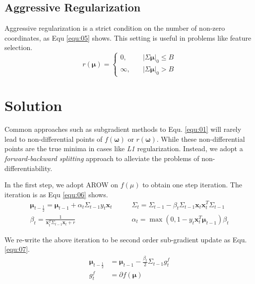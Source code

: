 \documentclass{article}
\begin{document}
\subsection{Aggressive Regularization}
Aggressive regularization is a strict condition on the number of non-zero
coordinates, as Equ \ref{equ:05} shows. This setting is useful in problems like feature selection.
\begin{equation}
    r(\bm{\mu}) = \left\{
        \begin{aligned}
            0, \quad & |\Sigma\bm{\mu}|_0 \leq B \\
            \infty, \quad & |\Sigma\bm{\mu}|_0 > B
        \end{aligned}
        \right.
    \label{equ:05}
\end{equation}

\section{Solution}
Common approaches such as subgradient methods to Equ. \ref{equ:01} will rarely
lead to non-differential points of $f(\bm{\omega})$ or $r(\bm{\omega})$. While
these non-differential points are the true minima in cases like \textit{L1}
regularization. Instead, we adopt a \emph{forward-backward splitting} approach
to alleviate the problems of non-differentiability.

In the first step, we adopt AROW on $f(\mu)$ to obtain one step iteration. The
iteration is as Equ \ref{equ:06} shows.
\begin{equation}
    \begin{aligned}
        \bm{\mu}_{t - \frac{1}{2}} = \bm{\mu}_{t-1} + \alpha_t\Sigma_{t-1}y_t\bm{x}_{t} \quad & \quad
        \Sigma_t = \Sigma_{t-1} - \beta_t\Sigma_{t-1}\bm{x}_t\bm{x}_t^T\Sigma_{t-1}\\
        \beta_t = \frac{1}{\bm{x}_t^T\Sigma_{t-1}\bm{x}_t + r} \quad & \quad
        \alpha_t = \max(0, 1 - y_t
        \bm{x}_t^T\bm{\mu}_{t-1})\beta_t
    \end{aligned}
    \label{equ:06}
\end{equation}

We re-write the above iteration to be second order sub-gradient update as Equ.
\ref{equ:07}.
\begin{equation}
    \begin{aligned}
        \bm{\mu}_{t - \frac{1}{2}} &= \bm{\mu}_{t-1} -
        \frac{\beta_t}{2}\Sigma_{t-1}g_t^f\\
        g_t^f &= \partial{f(\bm{\mu})} 
    \end{aligned}
    \label{equ:07}
\end{equation}
\end{document}
